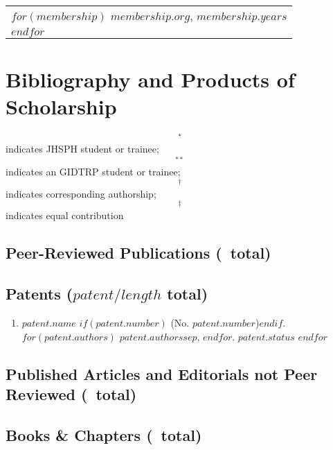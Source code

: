 \documentclass[martgin, line]{article}
\begin{document}
\begin{tabular}{l}
$for(membership)$
$membership.org$, $membership.years$\\
$endfor$
\end{tabular}


\section*{Bibliography and Products of Scholarship}

\begin{footnotesize}$$^*$$ indicates JHSPH student or trainee;
    $$^{**}$$ indicates an GIDTRP student or trainee;
    $$^\dagger$$ indicates corresponding authorship;
    $$^\ddagger$$ indicates equal contribution
  \end{footnotesize}

\subsection*{Peer-Reviewed Publications (\npeer\ total)} 

\begin{enumerate}
  
\end{enumerate}


\subsection*{Patents ($patent/length$ total)}
\begin{enumerate}
  $for(patent)$
  \item
  $patent.name$
  $if(patent.number)$ (No. $patent.number$)$endif$.
  $for(patent.authors)$
  $patent.authors$$sep$,
  $endfor$.
  \textit{$patent.status$}
  $endfor$
\end{enumerate}


\subsection*{Published Articles and Editorials not Peer Reviewed (\nnopeer\ total)}

\begin{enumerate}
  
\end{enumerate}


\subsection*{Books \& Chapters (\nchapters\ total)}
\end{document}
